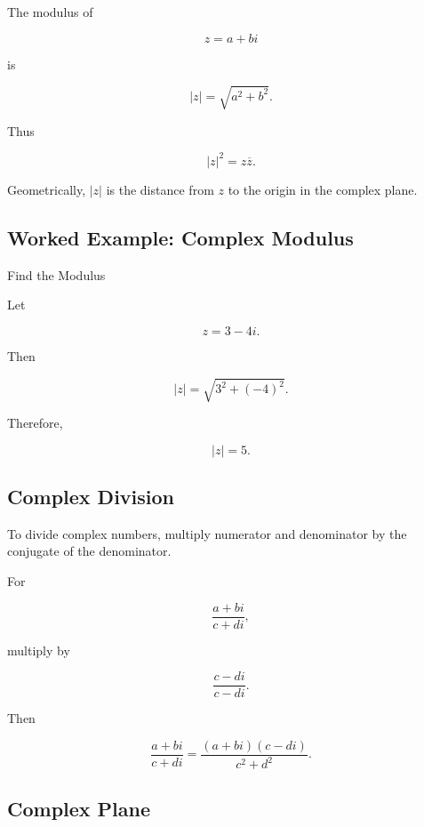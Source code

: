 The modulus of

\[
z=a+bi
\]

is

\[
\boxed{
|z|
=
\sqrt{a^2+b^2}.
}
\]

Thus

\[
\boxed{
|z|^2
=
z\overline{z}.
}
\]

Geometrically, \(|z|\) is the distance from \(z\) to the origin in the
complex plane.

\subsection{Worked Example: Complex Modulus}
\label{subsec:worked-complex-modulus}

\begin{workedexamplebox}{Find the Modulus}

Let

\[
z=3-4i.
\]

Then

\[
|z|
=
\sqrt{
3^2+(-4)^2
}.
\]

Therefore,

\begin{answerbox}
\[
\boxed{
|z|=5.
}
\]
\end{answerbox}

\end{workedexamplebox}

\subsection{Complex Division}
\label{subsec:complex-division-reference}

To divide complex numbers, multiply numerator and denominator by the conjugate
of the denominator.

For

\[
\frac{a+bi}{c+di},
\]

multiply by

\[
\frac{c-di}{c-di}.
\]

Then

\[
\boxed{
\frac{a+bi}{c+di}
=
\frac{
(a+bi)(c-di)
}{
c^2+d^2
}.
}
\]

\subsection{Complex Plane}
\label{subsec:complex-plane-reference}

